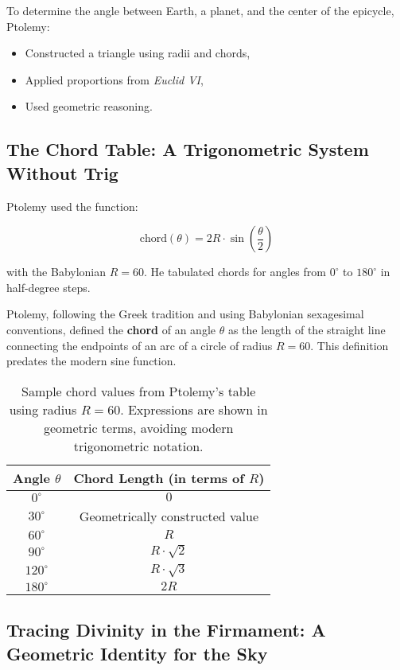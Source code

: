 To determine the angle between Earth, a planet, and the center of the epicycle, Ptolemy:

\begin{itemize}
    \item Constructed a triangle using radii and chords,
    \item Applied proportions from \textit{Euclid VI},
    \item Used geometric reasoning.
\end{itemize}

\subsection{The Chord Table: A Trigonometric System Without Trig}

Ptolemy used the function:

\[
\text{chord}(\theta) = 2R \cdot \sin\left(\frac{\theta}{2}\right)
\]

with the Babylonian \( R = 60 \). He tabulated chords for angles from \( 0^\circ \) to \( 180^\circ \) in half-degree steps.

Ptolemy, following the Greek tradition and using Babylonian sexagesimal conventions, defined the \textbf{chord} of an angle \( \theta \) as the length of the straight line connecting the endpoints of an arc of a circle of radius \( R = 60 \). This definition predates the modern sine function.

\begin{table}[H]
\centering
\renewcommand{\arraystretch}{1.4}
\begin{tabular}{|c|c|}
\hline
\textbf{Angle \( \theta \)} & \textbf{Chord Length (in terms of \( R \))} \\
\hline
\( 0^\circ \) & \( 0 \) \\
\( 30^\circ \) & Geometrically constructed value \\
\( 60^\circ \) & \( R \) \\
\( 90^\circ \) & \( R \cdot \sqrt{2} \) \\
\( 120^\circ \) & \( R \cdot \sqrt{3} \) \\
\( 180^\circ \) & \( 2R \) \\
\hline
\end{tabular}
\caption{Sample chord values from Ptolemy’s table using radius \( R = 60 \). Expressions are shown in geometric terms, avoiding modern trigonometric notation.}
\end{table}


\subsection{Tracing Divinity in the Firmament: A Geometric Identity for the Sky}

